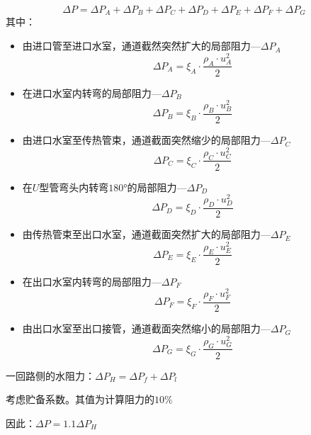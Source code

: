 \begin{enumerate}
          \begin{equation*}
              \Delta P=\Delta P_{A}+\Delta P_{B}+\Delta P_{C}+\Delta P_{D}+\Delta P_{E}+\Delta P_{F}+\Delta P_{G}
          \end{equation*}
          其中：
          \begin{itemize}
              \item 由进口管至进口水室，通道截然突然扩大的局部阻力—$ \Delta P_A $
                    \begin{equation*}
                        \Delta P_{A}=\xi_{A} \cdot \frac{\rho_{A} \cdot u_{A}^{2}}{2}
                    \end{equation*}
              \item 在进口水室内转弯的局部阻力—$ \Delta P_B $
                    \begin{equation*}
                        \Delta P_{B}=\xi_{B} \cdot \frac{\rho_{B} \cdot u_{B}^{2}}{2}
                    \end{equation*}
              \item 由进口水室至传热管束，通道截面突然缩少的局部阻力—$ \Delta P_C $
                    \begin{equation*}
                        \Delta P_{C}=\xi_{C} \cdot \frac{\rho_{C} \cdot u_{C}^{2}}{2}
                    \end{equation*}
              \item 在$ U $型管弯头内转弯$ 180° $的局部阻力—$\Delta P_D$
                    \begin{equation*}
                        \Delta P_{D}=\xi_{D} \cdot \frac{\rho_{D} \cdot u_{D}^{2}}{2}
                    \end{equation*}
              \item 由传热管束至出口水室，通道截面突然扩大的局部阻力—$ \Delta P_E $
                    \begin{equation*}
                        \Delta P_{E}=\xi_{E} \cdot \frac{\rho_{E} \cdot u_{E}^{2}}{2}
                    \end{equation*}
              \item 在出口水室内转弯的局部阻力—$ \Delta P_F $
                    \begin{equation*}
                        \Delta P_{F}=\xi_{F} \cdot \frac{\rho_{F} \cdot u_{F}^{2}}{2}
                    \end{equation*}
              \item 由出口水室至出口接管，通道截面突然缩小的局部阻力—$ \Delta P_G $
                    \begin{equation*}
                        \Delta P_{G}=\xi_{G} \cdot \frac{\rho_{G} \cdot u_{G}^{2}}{2}
                    \end{equation*}
          \end{itemize}
          一回路侧的水阻力：$ \Delta P_H = \Delta P_f + \Delta P_l $
          \par 考虑贮备系数。其值为计算阻力的$10\%$
          \par 因此：$ \Delta P = 1.1 \Delta P_H $
\end{enumerate}

